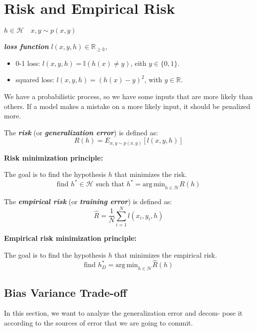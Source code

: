 \section{Risk and Empirical Risk}

$h \in \mathcal{H} \quad x,y \sim p(x,y)$

\textbf{\textit{loss function}} $l(x,y,h) \in \mathbb{R_{\ge 0}}$, 

\begin{itemize}
    \item 0-1 loss: $l(x,y,h) = \mathbb{I}(h(x) \neq y)$, eith $y \in \{0, 1\}$.
    \item squared loss: $l(x,y,h) = (h(x) - y)^2$, with $y \in \mathbb{R}$.
\end{itemize}

We have a probabilistic process, so we have some inputs that are more likely than others. If a model makes a mistake on a more likely input, it should be penalized more.

\begin{definitionblock}[Risk]
The \textbf{\textit{risk}} (or \textbf{\textit{generalization error}}) is defined as:
$$
R(h) = E_{x,y \sim p(x,y)}[l(x,y,h)]
$$ 
\end{definitionblock}

\textbf{Risk minimization principle:}

The goal is to find the hypothesis $h$ that minimizes the risk.
$$
\text{find } h^* \in \mathcal{H} \text{ such that } h^* = \mathrm{arg\,min}_{h \in \mathcal{H}} R(h)
$$

\begin{definitionblock}
The \textbf{\textit{empirical risk}} (or \textbf{\textit{training error}}) is defined as:
$$
\hat R = \dfrac 1N \sum_{i=1}^N l(x_i, y_i, h)
$$
\end{definitionblock}


\textbf{Empirical risk minimization principle:}

The goal is to find the hypothesis $h$ that minimizes the empirical risk.
$$
\text{find } h^*_D = \mathrm{arg\,min}_{h \in \mathcal{H}} \hat R(h)
$$

\subsection{Bias Variance Trade-off}

In this section, we want to analyze the generalization error and decom-
pose it according to the sources of error that we are going to commit.

